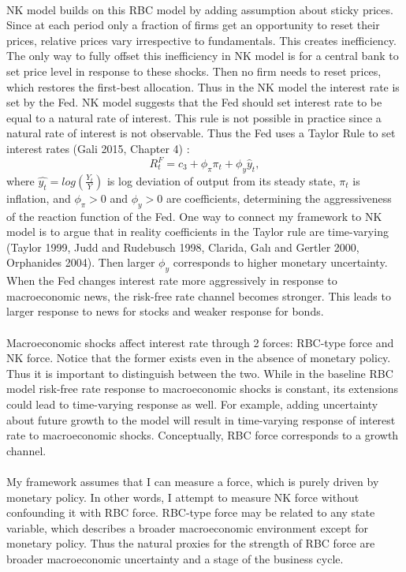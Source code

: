\documentclass[12pt]{article}
\begin{document}
\paragraph{}
NK model builds on this RBC model by adding assumption about sticky prices. Since at each period only a fraction of firms get an opportunity to reset their prices, relative prices vary irrespective to fundamentals. This creates inefficiency. The only way to fully offset this inefficiency in NK model is for a central bank to set price level in response to these shocks. Then no firm needs to reset prices, which restores the first-best allocation. Thus in the NK model the interest rate is set by the Fed. NK model suggests that the Fed should set interest rate to be equal to a natural rate of interest. This rule is not possible in practice since a natural rate of interest is not observable. Thus the Fed uses a Taylor Rule to set interest rates (Gali 2015, Chapter 4) :
\begin{equation}
    R^F_t = c_3 + \phi_{\pi} \pi_t + \phi_y \hat{y}_t,
\end{equation}
where $\hat{y_t} = log(\frac{Y_t}{Y})$ is log deviation of output from its steady state, $\pi_t$ is inflation, and $\phi_{\pi} > 0$ and $\phi_{y} > 0$ are coefficients, determining the aggressiveness of the reaction function of the Fed. One way to connect my framework to NK model is to argue that in reality coefficients in the Taylor rule are time-varying (Taylor 1999, Judd and Rudebusch 1998, Clarida, Galı and Gertler 2000, Orphanides
2004). Then larger $\phi_y$ corresponds to higher monetary uncertainty. When the Fed changes interest rate more aggressively in response to macroeconomic news, the risk-free rate channel becomes stronger. This leads to larger response to news for stocks and weaker response for bonds.
\paragraph{}
Macroeconomic shocks affect interest rate through 2 forces: RBC-type force and NK force. Notice that the former exists even in the absence of monetary policy. Thus it is important to distinguish between the two. While in the baseline RBC model risk-free rate response to macroeconomic shocks is constant, its extensions could lead to time-varying response as well. For example, adding uncertainty about future growth to the model will result in time-varying response of interest rate to macroeconomic shocks. Conceptually, RBC force corresponds to a growth channel.
\paragraph{}
My framework assumes that I can measure a force, which is purely driven by monetary policy. In other words, I attempt to measure NK force without confounding it with RBC force. RBC-type force may be related to any state variable, which describes a broader macroeconomic environment except for monetary policy. Thus the natural proxies for the strength of RBC force are broader macroeconomic uncertainty and a stage of the business cycle.
\end{document}
